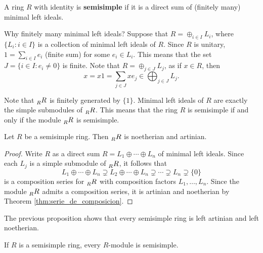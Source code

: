 \begin{definition}
    A ring $R$ with identity is \textbf{semisimple} if it is a direct sum of (finitely many) 
    minimal left ideals. 
\end{definition}

Why finitely many minimal left ideals?
Suppose that $R=\oplus_{i\in I}L_i$, where $\{L_i:i\in I\}$ is a collection of
minimal left ideals of $R$. 
Since $R$ is unitary, $1=\sum_{i\in I}e_i$ (finite sum) for 
some $e_i\in L_i$. This means that the set $J=\{i\in I:e_i\ne 0\}$ is finite.
Note that $R=\oplus_{j\in J}L_j$, as 
if $x\in R$, then 
\[
x=x1=\sum_{j\in J}xe_j\in \bigoplus_{j\in J}L_j.
\]

Note
that $\prescript{}{R}{R}$ is finitely generated by $\{1\}$. Minimal left ideals of $R$ 
are exactly the simple submodules of $\prescript{}{R}{R}$. 
This means that 
the ring $R$ is semisimple if and only if the module
$\prescript{}{R}{R}$ is semisimple.  

\begin{proposition}
    Let $R$ be a semisimple ring. Then $\prescript{}{R}{R}$ is noetherian and artinian.
\end{proposition}

\begin{proof}
    Write $R$ as a direct sum $R=L_1\oplus\cdots\oplus L_n$ of minimal left ideals. Since 
    each $L_j$ is a simple submodule of $\prescript{}{R}{R}$, it follows that 
    \[
    L_1\oplus\cdots\oplus L_n\supsetneq L_2\oplus\cdots\oplus L_n\supsetneq\cdots\supsetneq L_n\supsetneq\{0\}
    \]
    is a composition series for $\prescript{}{R}{R}$ with composition factors
    $L_1,\dots,L_n$. Since the module $\prescript{}{R}{R}$ admits a composition
    series, it is artinian and noetherian by Theorem \ref{thm:serie_de_composicion}. 
\end{proof}

The previous proposition shows 
that every semisimple ring is left artinian and left noetherian. 

\begin{exercise}
\label{xca:semisimple}
    If $R$ is a semisimple ring, every $R$-module is semisimple. 
\end{exercise}


